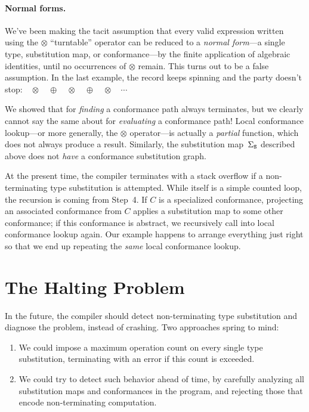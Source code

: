 \documentclass[../generics]{subfiles}
\begin{document}
\paragraph{Normal forms.}
We've been making the tacit assumption that every valid expression written using the $\otimes$ ``turntable'' operator can be reduced to a \emph{normal form}---a single type, substitution map, or conformance---by the finite application of algebraic identities, until no occurrences of $\otimes$ remain. This turns out to be a false assumption. In the last example, the record keeps spinning and the party doesn't stop:$\quad \otimes \quad \oplus \quad \otimes \quad \oplus \quad \otimes \quad \cdots$

We showed that  for \emph{finding} a conformance path always terminates, but we clearly cannot say the same about  for \emph{evaluating} a conformance path! Local conformance lookup---or more generally, the $\otimes$ operator---is actually a \emph{partial} function, which does not always produce a result. Similarly, the substitution map~$\Sigma_\texttt{S}$ described above does not \emph{have} a conformance substitution graph.

At the present time, the compiler terminates with a stack overflow if a non-terminating type substitution is attempted. While  itself is a simple counted loop, the recursion is coming from Step~4. If $C$ is a specialized conformance, projecting an associated conformance from $C$ applies a substitution map to some other conformance; if this conformance is abstract, we recursively call into local conformance lookup again. Our example happens to arrange everything just right so that we end up repeating the \emph{same} local conformance lookup.

\section{The Halting Problem}\label{tag systems}

In the future, the compiler should detect non-terminating type substitution and diagnose the problem, instead of crashing. Two approaches spring to mind:
\begin{enumerate}
\item We could impose a maximum operation count on every single type substitution, terminating with an error if this count is exceeded.
\item We could try to detect such behavior ahead of time, by carefully analyzing all substitution maps and conformances in the program, and rejecting those that encode non-terminating computation.
\end{enumerate}
\end{document}
